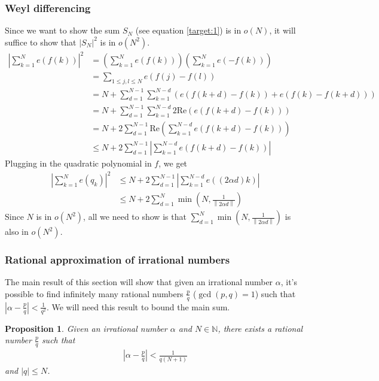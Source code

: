 \documentclass[12pt, titlepage]{article}
\newtheorem{prop}[thm]{Proposition}
\theoremstyle{definition}
\newcommand{\norm}[1]{\left\lVert#1\right\rVert}
\renewcommand{\Re}{\mathrm{Re}}
\begin{document}
\subsubsection{Weyl differencing} \label{sect:1}
Since we want to show the sum $S_N$ (see equation \ref{target:1}) is in $o(N)$, it will suffice to show that $\left| S_N \right|^2$ is in $o(N^2)$.
\begin{align*}
    \left| \sum_{k=1}^{N} e(f(k)) \right|^2 &= \left( \sum_{k=1}^{N} e(f(k)) \right) \left( \sum_{k=1}^{N} e(-f(k)) \right) \\
    &= \sum_{1 \leq j,l \leq N} e(f(j) - f(l)) \\
    &= N + \sum_{d=1}^{N-1} \sum_{k=1}^{N-d} \left( e(f(k+d) - f(k)) + e(f(k) - f(k+d)) \right) \\
    &= N + \sum_{d=1}^{N-1} \sum_{k=1}^{N-d} 2\Re \left( e(f(k+d) - f(k)) \right) \\
    &= N + 2 \sum_{d=1}^{N-1} \Re \left( \sum_{k=1}^{N-d} e(f(k+d) - f(k)) \right) \\
    &\leq N + 2 \sum_{d=1}^{N-1} \left| \sum_{k=1}^{N-d} e(f(k+d) - f(k)) \right|
\end{align*}
Plugging in the quadratic polynomial in $f$, we get
\begin{align*}
    \left| \sum_{k=1}^{N} e(q_k) \right|^2 &\leq N + 2\sum_{d=1}^{N-1} \left| \sum_{k=1}^{N-d} e((2\alpha d)k) \right| \\
    &\leq N + 2 \sum_{d=1}^{N} \min \left( N, \frac{1}{\norm{2\alpha d}} \right)
\end{align*}
Since $N$ is in $o(N^2)$, all we need to show is that $\displaystyle \sum_{d=1}^{N} \min\left( N, \frac{1}{\norm{2\alpha d}} \right)$ is also in $o(N^2)$.

\subsubsection{Rational approximation of irrational numbers}
The main result of this section will show that given an irrational number $\alpha$, it's possible to find infinitely many rational numbers $\frac{p}{q}$ ($\gcd(p,q) = 1$) such that $|\alpha - \frac{p}{q}| < \frac{1}{q^2}$. We will need this result to bound the main sum.

\begin{prop} \label{prop:1}
    Given an irrational number $\alpha$ and $N \in \mathbb{N}$, there exists a rational number $\frac{p}{q}$ such that
    \begin{align*}
        \left| \alpha - \frac{p}{q} \right| < \frac{1}{q(N+1)}
    \end{align*}
    and $|q| \leq N$.
\end{prop}
\end{document}
